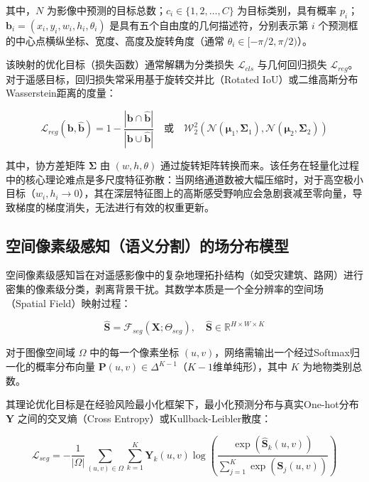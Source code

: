 其中，$N$ 为影像中预测的目标总数；$c_i \in \{1, 2, \dots, C\}$ 为目标类别，具有概率 $p_i$；$\mathbf{b}_i = (x_i, y_i, w_i, h_i, \theta_i)$ 是具有五个自由度的几何描述符，分别表示第 $i$ 个预测框的中心点横纵坐标、宽度、高度及旋转角度（通常 $\theta_i \in [-\pi/2, \pi/2)$）。

该映射的优化目标（损失函数）通常解耦为分类损失 $\mathcal{L}_{cls}$ 与几何回归损失 $\mathcal{L}_{reg}$。对于遥感目标，回归损失常采用基于旋转交并比（Rotated IoU）或二维高斯分布Wasserstein距离的度量：

\begin{equation}
\mathcal{L}_{reg}(\mathbf{b}, \hat{\mathbf{b}}) = 1 - \frac{|\mathbf{b} \cap \hat{\mathbf{b}}|}{|\mathbf{b} \cup \hat{\mathbf{b}}|} \quad \text{或} \quad \mathcal{W}_2^2(\mathcal{N}(\mathbf{\mu}_1, \mathbf{\Sigma}_1), \mathcal{N}(\mathbf{\mu}_2, \mathbf{\Sigma}_2))
\end{equation}

其中，协方差矩阵 $\mathbf{\Sigma}$ 由 $(w, h, \theta)$ 通过旋转矩阵转换而来。该任务在轻量化过程中的核心理论难点是多尺度特征弥散：当网络通道数被大幅压缩时，对于高空极小目标（$w_i, h_i \to 0$），其在深层特征图上的高斯感受野响应会急剧衰减至零向量，导致梯度的梯度消失，无法进行有效的权重更新。

\subsection{空间像素级感知（语义分割）的场分布模型}

空间像素级感知旨在对遥感影像中的复杂地理拓扑结构（如受灾建筑、路网）进行密集的像素级分类，剥离背景干扰。其数学本质是一个全分辨率的空间场（Spatial Field）映射过程：

\begin{equation}
\hat{\mathbf{S}} = \mathcal{F}_{seg}(\mathbf{X}; \Theta_{seg}), \quad \hat{\mathbf{S}} \in \mathbb{R}^{H \times W \times K}
\end{equation}

对于图像空间域 $\Omega$ 中的每一个像素坐标 $(u, v)$，网络需输出一个经过Softmax归一化的概率分布向量 $\mathbf{P}(u, v) \in \Delta^{K-1}$（$K-1$维单纯形），其中 $K$ 为地物类别总数。

其理论优化目标是在经验风险最小化框架下，最小化预测分布与真实One-hot分布 $\mathbf{Y}$ 之间的交叉熵（Cross Entropy）或Kullback-Leibler散度：

\begin{equation}
\mathcal{L}_{seg} = -\frac{1}{|\Omega|} \sum_{(u,v) \in \Omega} \sum_{k=1}^K \mathbf{Y}_{k}(u,v) \log \left( \frac{\exp(\hat{\mathbf{S}}_{k}(u,v))}{\sum_{j=1}^K \exp(\hat{\mathbf{S}}_{j}(u,v))} \right)
\end{equation}


